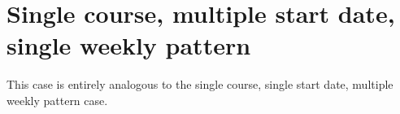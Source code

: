\section{Single course, multiple start date, single weekly pattern}

This case is entirely analogous to the single course, single start date, multiple weekly pattern case.
